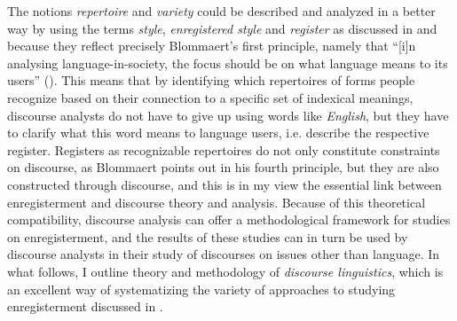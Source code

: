 The notions \textit{repertoire} and \textit{variety} could be described and analyzed in a better way by using the terms \textit{style}, \textit{enregistered style} and \textit{register} as discussed in  and  because they reflect precisely Blommaert’s first principle, namely that “[i]n analysing language-in-society, the focus should be on what language means to its users” (\citeyear[14]{Blommaert2005}). This means that by identifying which repertoires of forms people recognize based on their connection to a specific set of indexical meanings, discourse analysts do not have to give up using words like \textit{English}, but they have to clarify what this word means to language users, i.e. describe the respective register. Registers as recognizable repertoires do not only constitute constraints on discourse, as Blommaert points out in his fourth principle, but they are also constructed through discourse, and this is in my view the essential link between enregisterment and discourse theory and analysis. Because of this theoretical compatibility, discourse analysis can offer a methodological framework for studies on enregisterment, and the results of these studies can in turn be used by discourse analysts in their study of discourses on issues other than language. In what follows, I outline  theory and methodology of \textit{discourse linguistics}, which is an excellent way of systematizing the variety of approaches to studying enregisterment discussed in .


